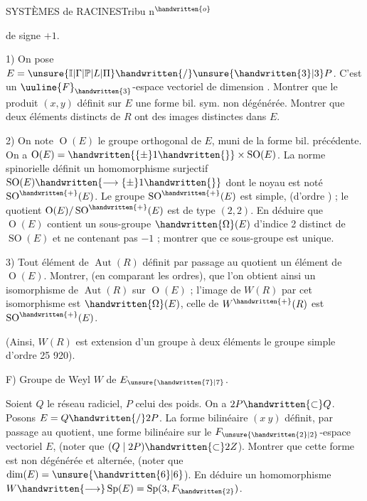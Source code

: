 SYSTÈMES de RACINES\hfill Tribu n$^{\handwritten{o}}$ 

de signe $+1$.

1) On pose $E=\unsure{\mathbb{I}|\Gamma|\mathbb{P}|L|\Pi}\handwritten{/}\unsure{\handwritten{3}|3}P$. C'est un $\uuline{F}_{\handwritten{3}}$-espace vectoriel de dimension . Montrer que le produit $(x,y)$ définit sur $E$ une forme bil. sym. non dégénérée. Montrer que deux éléments distincts de $R$ ont des images distinctes dans $E$.

2) On note $\operatorname{O}(E)$ le groupe orthogonal de $E$, muni de la forme bil. précédente. On a $\operatorname{O}(E)=\handwritten{\{\pm}1\handwritten{\}}\times\operatorname{SO}(E)$. La norme spinorielle définit un homomorphisme surjectif $\operatorname{SO}(E)\handwritten{\longrightarrow\{\pm}1\handwritten{\}}$ dont le noyau est noté $\operatorname{SO}^{\handwritten{+}}(E)$. Le groupe $\operatorname{SO}^{\handwritten{+}}(E)$ est simple, (d'ordre ) ; le quotient $\operatorname{O}(E)/\operatorname{SO}^{\handwritten{+}}(E)$ est de type $(2,2)$. En déduire que $\operatorname{O}(E)$ contient un sous-groupe $\handwritten{\Omega}(E)$ d'indice 2 distinct de $\operatorname{SO}(E)$ et ne contenant pas $-1$ ; montrer que ce sous-groupe est unique.

3) Tout élément de $\operatorname{Aut}(R)$ définit par passage au quotient un élément de $\operatorname{O}(E)$. Montrer, (en comparant les ordres), que l'on obtient ainsi un isomorphisme de $\operatorname{Aut}(R)$ sur $\operatorname{O}(E)$ ; l'image de $W(R)$ par cet isomorphisme est $\handwritten{\Omega}(E)$, celle de $W^{\handwritten{+}}(R)$ est $\operatorname{SO}^{\handwritten{+}}(E)$.

(Ainsi, $W(R)$ est extension d'un groupe à deux éléments  le groupe simple d'ordre 25 920).

F) Groupe de Weyl $W$ de $E_{\unsure{\handwritten{7}|7}}$.

Soient $Q$ le réseau radiciel, $P$ celui des poids. On a $2P\handwritten{\subset}Q$. Posons $E=Q\handwritten{/}2P$. La forme bilinéaire $(x\ y)$ définit, par passage au quotient, une forme bilinéaire sur le $F_{\unsure{\handwritten{2}|2}}$-espace vectoriel $E$, (noter que $(Q\mid 2P)\handwritten{\subset}2Z$). Montrer que cette forme est non dégénérée et alternée, (noter que $\dim(E)=\unsure{\handwritten{6}|6}$). En déduire un homomorphisme $W\handwritten{\longrightarrow}\operatorname{Sp}(E)=\operatorname{Sp}(3,F_{\handwritten{2}})$.

